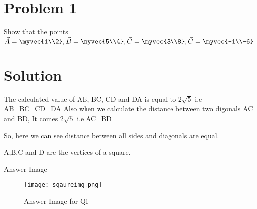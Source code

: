 \documentclass[journal,12pt,twocolumn]{IEEEtran}
\begin{document}
\maketitle
\newpage
\bigskip
\renewcommand{\thefigure}{\theenumi}
\renewcommand{\thetable}{\theenumi}

%

\section{Problem 1}
Show that the points$\vec {A}=\myvec {1\\2},
\vec {B}=\myvec {5\\4},
\vec {C}=\myvec {3\\8},
\vec {C}=\myvec {-1\\-6}$

\section{Solution}
The calculated value of AB, BC, CD and DA is equal to 2$\sqrt{5}$
i.e AB=BC=CD=DA
Also when we calculate the distance between two digonals AC and BD, It comes 2$\sqrt{5}$
i.e AC=BD

So, here we can see distance between all sides and diagonals are equal.
	
 A,B,C and D are the vertices of a square.
 
\begin{center}

Answer Image
\end{center}
\begin{figure}[h!]
\texttt{[image: sqaureimg.png]}
  \caption{Answer Image for Q1}
  \label{Answer Image for Q1}
\end{figure}
\end{document}
